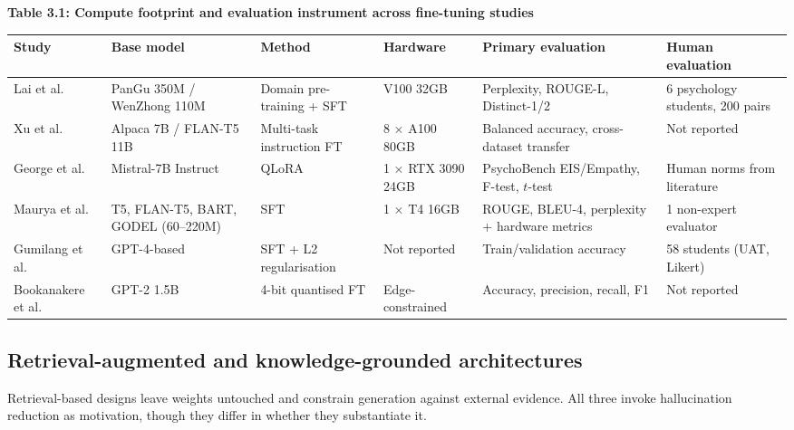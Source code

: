 \documentclass[11pt]{article}
\begin{document}
	\begin{center}
		\textbf{Table 3.1: Compute footprint and evaluation instrument across fine-tuning studies}
		\vspace{2pt}
		
		\scriptsize
		\setlength{\tabcolsep}{3pt}\renewcommand{\arraystretch}{1.1}
		\begin{tabularx}{\textwidth}{|X|X|X|X|X|X|}
			\hline
			\textbf{Study} & \textbf{Base model} & \textbf{Method} & \textbf{Hardware} & \textbf{Primary evaluation} & \textbf{Human evaluation} \\
			\hline
			Lai et al.\cite{lai2023psyllmscalingglobalmental} & PanGu 350M / WenZhong 110M & Domain pre-training + SFT & V100 32GB & Perplexity, ROUGE-L, Distinct-1/2 & 6 psychology students, 200 pairs \\
			\hline
			Xu et al.\cite{Xu_2024} & Alpaca 7B / FLAN-T5 11B & Multi-task instruction FT & 8 $\times$ A100 80GB & Balanced accuracy, cross-dataset transfer & Not reported \\
			\hline
			George et al.\cite{10774623} & Mistral-7B Instruct & QLoRA & 1 $\times$ RTX 3090 24GB & PsychoBench EIS/Empathy, F-test, $t$-test & Human norms from literature \\
			\hline
			Maurya et al.\cite{Maurya2025} & T5, FLAN-T5, BART, GODEL (60--220M) & SFT & 1 $\times$ T4 16GB & ROUGE, BLEU-4, perplexity + hardware metrics & 1 non-expert evaluator \\
			\hline
			Gumilang et al.\cite{Gumilang2024DevelopmentOA} & GPT-4-based & SFT + L2 regularisation & Not reported & Train/validation accuracy & 58 students (UAT, Likert) \\
			\hline
			Bookanakere et al.\cite{10743711} & GPT-2 1.5B & 4-bit quantised FT & Edge-constrained & Accuracy, precision, recall, F1 & Not reported \\
			\hline
		\end{tabularx}
	\end{center}
	
	\subsection{Retrieval-augmented and knowledge-grounded architectures}
	
	Retrieval-based designs leave weights untouched and constrain generation against external evidence. All three invoke hallucination reduction as motivation, though they differ in whether they substantiate it.
	
\end{document}
